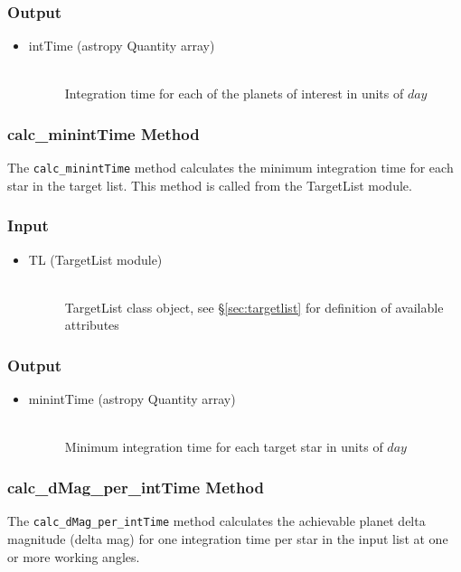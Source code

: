 \documentclass[cleanfoot]{asme2ej}
\begin{document}
\subsubsection*{Output}
\begin{itemize}
\item 
\begin{description}
    \item[intTime (astropy Quantity array)] \hfill \\ Integration time for each of the planets of interest in units of $ day $
\end{description}
\end{itemize}

\subsubsection{calc\_minintTime Method} \label{sec:calcminintTimetask}
The \verb+calc_minintTime+ method calculates the minimum integration time for each star in the target list.  This method is called from the TargetList module.

\subsubsection*{Input}
\begin{itemize}
\item 
\begin{description}
    \item[TL (TargetList module)] \hfill \\ TargetList class object, see \S\ref{sec:targetlist} for definition of available attributes
\end{description}
\end{itemize}

\subsubsection*{Output}
\begin{itemize}
\item
\begin{description}
    \item[minintTime (astropy Quantity array)] \hfill \\ Minimum integration time for each target star in units of $ day $
\end{description}
\end{itemize}

\subsubsection{calc\_dMag\_per\_intTime Method} \label{sec:calcdMagperintTime}
The \verb+calc_dMag_per_intTime+ method calculates the achievable planet delta magnitude (delta mag) for one integration time per star in the input list at one or more working angles.
\end{document}
